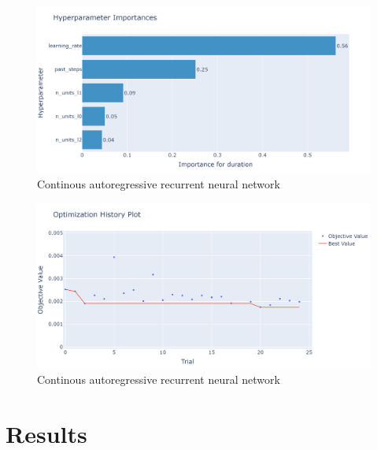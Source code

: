 \documentclass[11pt,table]{article}
\begin{document}
\begin{figure}[H]
	\centering
	\includegraphics[scale=1]{Figures/optimImportance.png}
	\caption{Continous autoregressive recurrent neural network}
	\label{fig:continousARNN}
\end{figure}

\begin{figure}[H]
	\centering
	\includegraphics[scale=1]{Figures/optimHistory.png}
	\caption{Continous autoregressive recurrent neural network}
	\label{fig:continousARNN}
\end{figure}

\section{Results}
\end{document}
